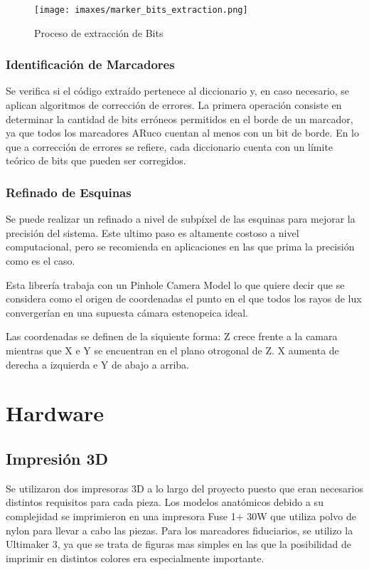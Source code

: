 \begin{figure}
  \centering
  \texttt{[image: imaxes/marker\_bits\_extraction.png]}
  \caption{Proceso de extracción de Bits}\label{fig:mbe}
\end{figure}

\subsubsection*{Identificación de Marcadores}
Se verifica si el código extraído pertenece al diccionario y, en caso necesario, se aplican algoritmos de corrección de errores.
La primera operación consiste en determinar la cantidad de bits erróneos permitidos en el borde de un marcador, ya que todos los marcadores ARuco cuentan al menos con un bit de borde. En lo que a corrección de errores se refiere, cada diccionario cuenta con un límite teórico de bits que pueden ser corregidos.

\subsubsection*{Refinado de Esquinas}
Se puede realizar un refinado a nivel de subpíxel de las esquinas para mejorar la precisión del sistema. Este ultimo paso es altamente costoso a nivel computacional, pero se recomienda en aplicaciones en las que prima la precisión como es el caso.

Esta librería trabaja con un Pinhole Camera Model lo que quiere decir que se considera como el origen de coordenadas el punto en el que todos los rayos de lux convergerían en una supuesta cámara estenopeica ideal.

Las coordenadas se definen de la siquiente forma: Z crece frente a la camara mientras que X e Y se encuentran en el plano otrogonal de Z. X aumenta de derecha a izquierda e Y de abajo a arriba.







\section{Hardware}
\subsection{Impresión 3D}
Se utilizaron dos impresoras 3D a lo largo del proyecto puesto que eran necesarios distintos requisitos para cada pieza.
Los modelos anatómicos debido a su complejidad se imprimieron en una impresora Fuse 1+ 30W que utiliza polvo de nylon para llevar a cabo las piezas.
Para los marcadores fiduciarios, se utilizo la Ultimaker 3, ya que se trata de figuras mas simples en las que la posibilidad de imprimir en distintos colores era especialmente importante.
